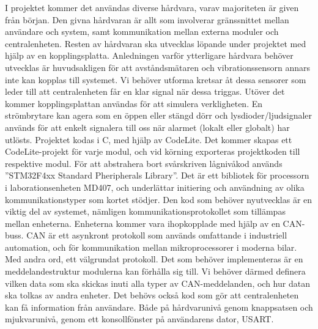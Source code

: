 \documentclass[a4paper]{article}
\begin{document}
I projektet kommer det användas diverse hårdvara, varav majoriteten är given från början. Den givna hårdvaran är allt som involverar gränssnittet mellan användare och system, samt kommunikation mellan externa moduler och centralenheten.
\newline
\newline
Resten av hårdvaran ska utvecklas löpande under projektet med hjälp av en kopplingsplatta. Anledningen varför ytterligare hårdvara behöver utvecklas är huvudsakligen för att avståndsmätaren och vibrationssensorn annars inte kan kopplas till systemet. Vi behöver utforma kretsar åt dessa sensorer som leder till att centralenheten får en klar signal när dessa triggas. Utöver det kommer kopplingsplattan användas för att simulera verkligheten. En strömbrytare kan agera som en öppen eller stängd dörr och lysdioder/ljudsignaler används för att enkelt signalera till oss när alarmet (lokalt eller globalt) har utlösts. 
\newline
\newline
Projektet kodas i C, med hjälp av CodeLite. Det kommer skapas ett CodeLite-projekt för varje modul, och vid körning exporteras projektkoden till respektive modul.
För att abstrahera bort svårskriven lågnivåkod används ''STM32F4xx Standard Pheripherals Library''. Det är ett bibliotek för processorn i laborationsenheten MD407, och underlättar initiering och användning av olika kommunikationstyper som kortet stödjer. 
\newline
\newline
Den kod som behöver nyutvecklas är en viktig del av systemet, nämligen kommunikationsprotokollet som tillämpas mellan enheterna. Enheterna kommer vara ihopkopplade med hjälp av en CAN-buss. CAN är ett asynkront protokoll som används omfattande i industriell automation, och för kommunikation mellan mikroprocessorer i moderna bilar. \cite[pg 249]{lme:2016} Med andra ord, ett välgrundat protokoll. 
\newline \newline
Det som behöver implementeras är en meddelandestruktur modulerna kan förhålla sig till. Vi behöver därmed definera vilken data som ska skickas inuti alla typer av CAN-meddelanden, och hur datan ska tolkas av andra enheter. Det behövs också kod som gör att centralenheten kan få information från användare. Både på hårdvarunivå genom knappsatsen och mjukvarunivå, genom ett konsollfönster på användarens dator, USART.

\end{document}
